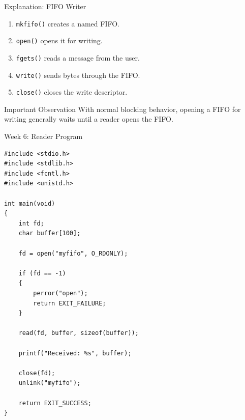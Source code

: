 \documentclass[aspectratio=169,10pt]{beamer}
\begin{document}
\begin{frame}{Explanation: FIFO Writer}

\begin{enumerate}
    \item \texttt{mkfifo()} creates a named FIFO.
    \item \texttt{open()} opens it for writing.
    \item \texttt{fgets()} reads a message from the user.
    \item \texttt{write()} sends bytes through the FIFO.
    \item \texttt{close()} closes the write descriptor.
\end{enumerate}

\begin{alertblock}{Important Observation}
With normal blocking behavior, opening a FIFO
for writing generally waits until a reader
opens the FIFO.
\end{alertblock}

\end{frame}

\begin{frame}[fragile]{Week 6: Reader Program}

\begin{lstlisting}[style=cstyle]
#include <stdio.h>
#include <stdlib.h>
#include <fcntl.h>
#include <unistd.h>

int main(void)
{
    int fd;
    char buffer[100];

    fd = open("myfifo", O_RDONLY);

    if (fd == -1)
    {
        perror("open");
        return EXIT_FAILURE;
    }

    read(fd, buffer, sizeof(buffer));

    printf("Received: %s", buffer);

    close(fd);
    unlink("myfifo");

    return EXIT_SUCCESS;
}
\end{lstlisting}

\end{frame}
\end{document}
